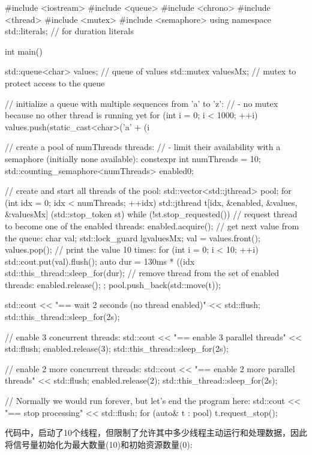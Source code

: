 \begin{cpp}
#include <iostream>
#include <queue>
#include <chrono>
#include <thread>
#include <mutex>
#include <semaphore>
using namespace std::literals; // for duration literals

int main()
{
	std::queue<char> values; // queue of values
	std::mutex valuesMx; // mutex to protect access to the queue

	// initialize a queue with multiple sequences from ’a’ to ’z’:
	// - no mutex because no other thread is running yet
	for (int i = 0; i < 1000; ++i) {
		values.push(static_cast<char>('a' + (i %
	}

	// create a pool of numThreads threads:
	// - limit their availability with a semaphore (initially none available):
	constexpr int numThreads = 10;
	std::counting_semaphore<numThreads> enabled{0};

	// create and start all threads of the pool:
	std::vector<std::jthread> pool;
	for (int idx = 0; idx < numThreads; ++idx) {
		std::jthread t{[idx, &enabled, &values, &valuesMx] (std::stop_token st) {
				while (!st.stop_requested()) {
					// request thread to become one of the enabled threads:
					enabled.acquire();
					// get next value from the queue:
					char val;
					{
						std::lock_guard lg{valuesMx};
						val = values.front();
						values.pop();
					}
					// print the value 10 times:
					for (int i = 0; i < 10; ++i) {
						std::cout.put(val).flush();
						auto dur = 130ms * ((idx %
						std::this_thread::sleep_for(dur);
					}
					// remove thread from the set of enabled threads:
					enabled.release();
					}
				}};
		pool.push_back(std::move(t));
	}

	std::cout << "== wait 2 seconds (no thread enabled)\n" << std::flush;
	std::this_thread::sleep_for(2s);

	// enable 3 concurrent threads:
	std::cout << "== enable 3 parallel threads\n" << std::flush;
	enabled.release(3);
	std::this_thread::sleep_for(2s);

	// enable 2 more concurrent threads:
	std::cout << "\n== enable 2 more parallel threads\n" << std::flush;
	enabled.release(2);
	std::this_thread::sleep_for(2s);

	// Normally we would run forever, but let’s end the program here:
	std::cout << "\n== stop processing\n" << std::flush;
	for (auto& t : pool) {
	t.request_stop();
	}
}
\end{cpp}

代码中，启动了10个线程，但限制了允许其中多少线程主动运行和处理数据，因此将信号量初始化为最大数量(10)和初始资源数量(0):

